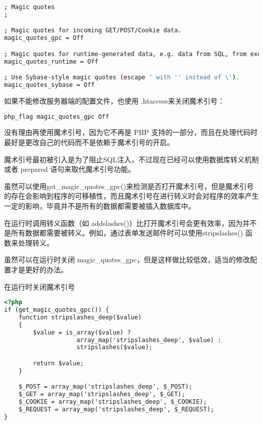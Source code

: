 \begin{lstlisting}[language=bash]
; Magic quotes
;

; Magic quotes for incoming GET/POST/Cookie data.
magic_quotes_gpc = Off

; Magic quotes for runtime-generated data, e.g. data from SQL, from exec(), etc.
magic_quotes_runtime = Off

; Use Sybase-style magic quotes (escape ' with '' instead of \').
magic_quotes_sybase = Off
\end{lstlisting}

如果不能修改服务器端的配置文件，也使用 .htaccess来关闭魔术引号：

\begin{lstlisting}[language=bash]
php_flag magic_quotes_gpc Off
\end{lstlisting}



没有理由再使用魔术引号，因为它不再是 PHP 支持的一部分，而且在处理代码时最好是更改自己的代码而不是依赖于魔术引号的开启。

魔术引号最初被引入是为了阻止SQL注入，不过现在已经可以使用数据库转义机制或者 prepared 语句来取代魔术引号功能。

虽然可以使用get\_magic\_quotes\_gpc()来检测是否打开魔术引号，但是魔术引号的存在会影响到程序的可移植性，而且魔术引号在进行转义时会对程序的效率产生一定的影响，毕竟并不是所有的数据都需要被插入数据库中。

在运行时调用转义函数（如 addslashes()）比打开魔术引号会更有效率，因为并不是所有数据都需要被转义。例如，通过表单发送邮件时可以使用stripslashes() 函数来处理转义。

虽然可以在运行时关闭 magic\_quotes\_gpc，但是这样做比较低效，适当的修改配置才是更好的办法。


\begin{example}
在运行时关闭魔术引号
\begin{lstlisting}[language=HTML]
<?php
if (get_magic_quotes_gpc()) {
    function stripslashes_deep($value)
    {
        $value = is_array($value) ?
                    array_map('stripslashes_deep', $value) :
                    stripslashes($value);

        return $value;
    }

    $_POST = array_map('stripslashes_deep', $_POST);
    $_GET = array_map('stripslashes_deep', $_GET);
    $_COOKIE = array_map('stripslashes_deep', $_COOKIE);
    $_REQUEST = array_map('stripslashes_deep', $_REQUEST);
}
\end{lstlisting}
\end{example}













